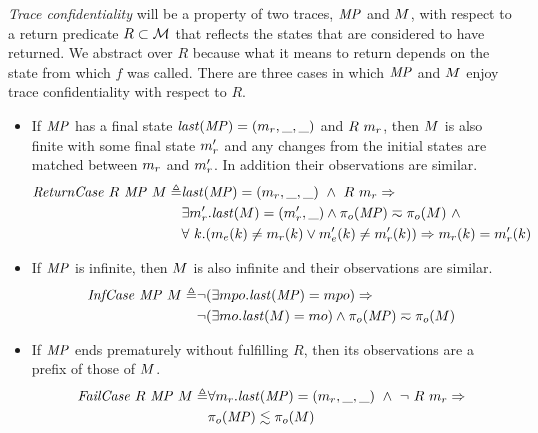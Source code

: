 \documentclass[acmsmall,review,anonymous]{acmart}\settopmatter{printfolios=true,printccs=false,printacmref=false}
\begin{document}
{
\label{def:trace-conf}

{\em Trace confidentiality} will be a property of two traces, \(\mathit{MP}\) and
\(M\), with respect to a return predicate \(R \subset {\mathcal M}\) that
reflects the states that are considered to have returned. We abstract over
\(R\) because what it means to return depends on the state from which
\(f\) was called. There are three cases in which \(\mathit{MP}\) and \(M\)
enjoy trace confidentiality with respect to \(R\).

\begin{itemize}
  \item If \(\mathit{MP}\) has a final state \(\mathit{last}(\mathit{MP}) = (m_r,\_,\_)\) and \(R\ m_r\), then \(M\) is also finite with
    some final state \(m_r'\) and any changes from the initial states are
    matched between \(m_r\) and \(m_r'\). In addition their
    observations are similar.
    \[\begin{split}
      \mathit{ReturnCase} ~ R ~ \mathit{MP} ~ M \triangleq &
      \mathit{last}(\mathit{MP}) =
        (m_r,\_,\_) ~ \land ~ R ~ m_r \Rightarrow \\
      & \exists m_r' . \mathit{last}(M) = (m_r',\_)
        \land \pi_o(\mathit{MP}) \eqsim \pi_o(M) ~ \land \\
      & \forall ~ k . (m_e(k) \not = m_r(k)
        \lor m_e'(k) \not = m_r'(k)) \Rightarrow
      m_r(k) = m_r'(k)
    \end{split}\]
  \item If \(\mathit{MP}\) is infinite, then \(M\) is also infinite and their
  observations are similar.
    \[\begin{split}
      \mathit{InfCase} ~ \mathit{MP} ~ M \triangleq
      & \neg (\exists mpo . \mathit{last}(\mathit{MP}) = mpo) \Rightarrow \\
      & \neg (\exists mo . \mathit{last}(M) = mo)
        \land \pi_o(\mathit{MP}) \eqsim \pi_o(M)
    \end{split}\]
\item If \(\mathit{MP}\) ends prematurely without fulfilling \(R\), then
  its observations are a prefix of those of \(M\).
    \[\begin{split}
      \mathit{FailCase} ~ R ~ \mathit{MP} ~ M \triangleq
      & \forall m_r .
        \mathit{last}(\mathit{MP}) = (m_r,\_,\_) ~ \land ~ \neg ~ R ~ m_r \Rightarrow \\
      & \pi_o(\mathit{MP}) \lesssim \pi_o(M)
    \end{split}\]
\end{itemize}

}
\end{document}
